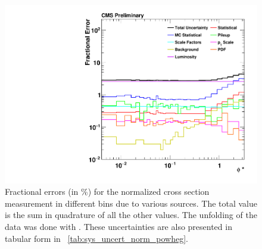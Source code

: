 \begin{figure}[!p]
    \centering
    \includegraphics[width=\textwidth]{figures/data_uncertainty_absolute_powheg_unfolded.pdf}
    \caption[
        Fractional errors (in \%) for the normalized cross section measurement.
    ]{
        Fractional errors (in \%) for the normalized cross section measurement in
        different \phistar bins due to various sources. The total value is the
        sum in quadrature of all the other values. The unfolding of the data
        was done with \POWHEG. These uncertainties are also presented in
        tabular form in \TAB~\ref{tab:sys_uncert_norm_powheg}.
    }
    \label{fig:sys_uncert_norm_powheg}
\end{figure}
